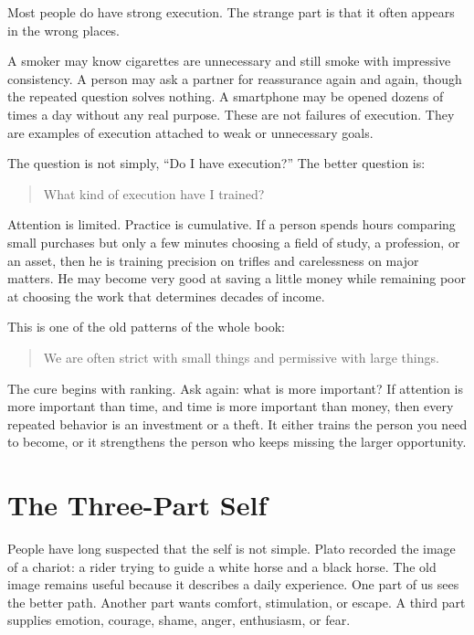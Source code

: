 Most people do have strong execution. The strange part is that it often appears in the wrong places.

A smoker may know cigarettes are unnecessary and still smoke with impressive consistency. A person may ask a partner for reassurance again and again, though the repeated question solves nothing. A smartphone may be opened dozens of times a day without any real purpose. These are not failures of execution. They are examples of execution attached to weak or unnecessary goals.

The question is not simply, ``Do I have execution?'' The better question is:

\begin{quote}
What kind of execution have I trained?
\end{quote}

Attention is limited. Practice is cumulative. If a person spends hours comparing small purchases but only a few minutes choosing a field of study, a profession, or an asset, then he is training precision on trifles and carelessness on major matters. He may become very good at saving a little money while remaining poor at choosing the work that determines decades of income.

This is one of the old patterns of the whole book:

\begin{quote}
We are often strict with small things and permissive with large things.
\end{quote}

The cure begins with ranking. Ask again: what is more important? If attention is more important than time, and time is more important than money, then every repeated behavior is an investment or a theft. It either trains the person you need to become, or it strengthens the person who keeps missing the larger opportunity.

\section*{The Three-Part Self}

People have long suspected that the self is not simple. Plato recorded the image of a chariot: a rider trying to guide a white horse and a black horse. The old image remains useful because it describes a daily experience. One part of us sees the better path. Another part wants comfort, stimulation, or escape. A third part supplies emotion, courage, shame, anger, enthusiasm, or fear.

